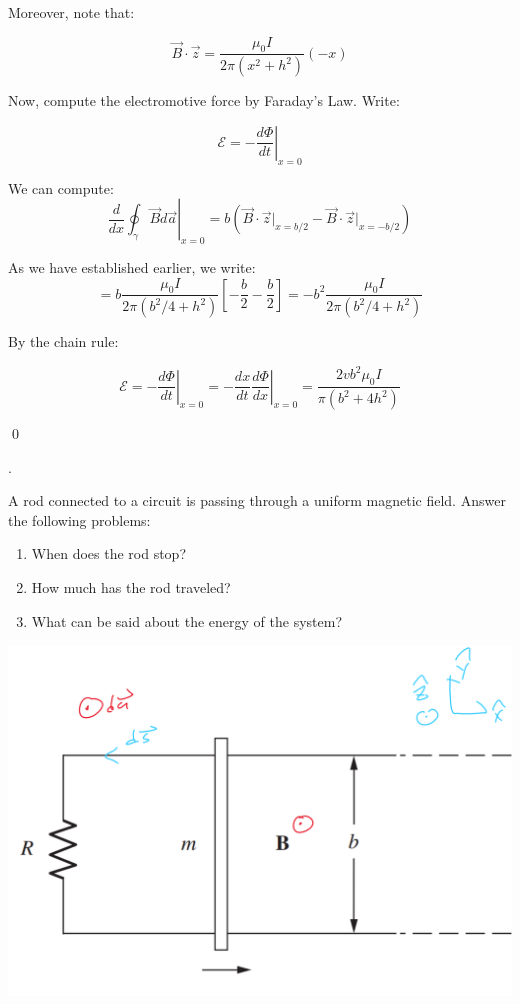 \documentclass{article}
\newcounter{problemcnt}
\newcommand{\nProblem}[1]{
    \vspace{5mm}
    \noindent
    \setcounter{problemcnt}{#1}
    \arabic{problemcnt}. 
}
\begin{document}
Moreover, note that:

\[
    \vec{B}\cdot \vec{z} 
    = 
    \frac{\mu_0 I}
    {2\pi (x^2+h^2)}
    (-x)
\]

Now, compute the electromotive force 
by Faraday's Law. Write:

\def\EMF{{\mathcal{E}}}

\[
    \left.
    \EMF = 
    -
    \frac{d\Phi} {dt}
    \right|
    _{x = 0}    
\]

We can compute:
\[
    \left.
        \frac{d}{dx}
        \oint_{\gamma}
        \vec{B}d{\vec{a}}
    \right|_{x = 0}
    =
    b(\vec{B}\cdot\vec{z}
    \bigg|_{x = b/2}
    -\vec{B}\cdot\vec{z}
    \bigg|_{x = -b/2}
    )
\]

As we have established earlier, we write:
\[
    = b 
    \frac{\mu_0 I}
    {2 \pi (b^2/4+h^2)}
    \left[    
        -\frac{b}{2}
        -\frac{b}{2}
    \right]
    =
    -b^2
    \frac{\mu_0 I}
    {2 \pi (b^2/4+h^2)}
\]

By the chain rule:


\[
    \boxed{
    \left.
    \EMF = 
    -
    \frac{d\Phi} {dt}
    \right|
    _{x = 0}   
    =
    -
    \frac{dx}{dt}
    \left.
    \frac{d\Phi} {dx}
    \right|
    _{x = 0} 
    =
    \frac{2vb^2\mu_0I}{\pi(b^2+4h^2)}
    }
\]

\qed


\newpage

\nProblem{2}
A rod connected to a circuit 
is passing through a uniform magnetic 
field. Answer the following problems:
\begin{enumerate}
    \item When does the rod stop?
    \item How much has the rod traveled?
    \item What can be said about the energy of the system?
\end{enumerate}

\includegraphics[width = .7\linewidth]{Q2_setup.png}
\end{document}
